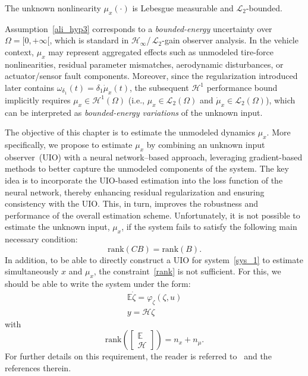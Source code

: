 \begin{assumption}\label{ali_hyp3}
The unknown nonlinearity $\mu_{x}(\cdot)$ is Lebesgue measurable and $\mathcal{L}_{2}$-bounded.
\end{assumption}


\begin{remark}
Assumption~\ref{ali_hyp3} corresponds to a \emph{bounded-energy} uncertainty over $\Omega=[0,+\infty[$, which is standard in $\mathcal{H}_{\infty}$/\,$\mathcal{L}_{2}$-gain observer analysis. In the vehicle context, $\mu_x$ may represent aggregated effects such as unmodeled tire-force nonlinearities, residual parameter mismatches, aerodynamic disturbances, or actuator/sensor fault components.
Moreover, since the regularization introduced later contains $\omega_{\delta_{1}}(t)=\delta_1\dot{\mu}_x(t)$, the subsequent $\mathcal{H}^1$ performance bound implicitly requires $\mu_x\in\mathcal{H}^1(\Omega)$ (i.e., $\mu_x\in\mathcal{L}_2(\Omega)$ and $\dot{\mu}_x\in\mathcal{L}_2(\Omega)$), which can be interpreted as \emph{bounded-energy variations} of the unknown input.
\end{remark}


The objective of this chapter is to estimate the unmodeled dynamics $\mu_{x}$. More specifically, we propose to estimate $\mu_{x}$ by combining an unknown input observer~(UIO) with a neural network--based approach, leveraging gradient-based methods to better capture the unmodeled components of the system. The key idea is to incorporate the UIO-based estimation into the loss function of the neural network, thereby enhancing residual regularization and ensuring consistency with the UIO. This, in turn, improves the robustness and performance of the overall estimation scheme. Unfortunately, it is not possible to estimate the unknown input, $\mu_x$, if the system fails to satisfy the following main necessary condition:
\begin{equation}\label{rank}
\textrm{rank}(C B) = \textrm{rank}(B).
\end{equation}
%
In addition, to be able to directly construct a UIO for system~\eqref{sys_1} to estimate simultaneously $x$ and $\mu_x$, the constraint~\eqref{rank} is not sufficient. For this, we should be able to write the system under the form:
\begin{equation}\label{sys_2}
    \begin{array}{l}
        \mathbb{E} \dot{\zeta} = \varphi_{\zeta}(\zeta,u)  \\
        y = \mathcal{H} \zeta
    \end{array}
\end{equation}
with
\begin{equation}\label{rank2}
\textrm{rank}\left( \begin{bmatrix} \mathbb{E} \\  \mathcal{H} \end{bmatrix} \right) = n_{x} + n_{\mu}.
\end{equation}
For further details on this requirement, the reader is referred to~\cite{chaouche2022unknown,trinh2011functional,Zemouche-Boutayeb-2009,Hassan13a,Trinh:TAC08} and the references therein. 

